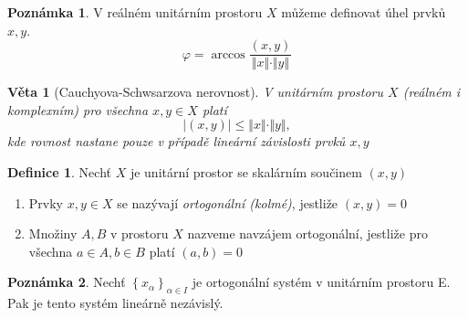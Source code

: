 \documentclass[a4]{report}
\newtheorem{theorem}{Věta}
\theoremstyle{definition}
\newtheorem{definition}{Definice}[section]
\newtheorem{notes}{Poznámka}[section]
\begin{document}
{\begin{notes}
	V reálném unitárním prostoru $X$ můžeme definovat úhel prvků $x,y$. \begin{equation*}
		\varphi = \arccos \frac{(x,y)}{\Vert x\Vert \cdot \Vert y \Vert }
	\end{equation*}
\end{notes}

\begin{theorem}[Cauchyova-Schwsarzova nerovnost]
V unitárním prostoru $X$ (reálném i komplexním) pro všechna $x,y\in X$ platí
\begin{equation*}
	\vert (x,y)\vert \leq \Vert x\Vert \cdot \Vert y \Vert,
\end{equation*}
	kde rovnost nastane pouze v případě lineární závislosti prvků $x,y$
\end{theorem}
\begin{definition}
Nechť $X$ je unitární prostor se skalárním součinem $(x,y)$
\begin{enumerate}
	\item Prvky $x,y \in X$ se nazývají \textit{ortogonální (kolmé)}, jestliže $(x,y)=0$
	\item Množiny $A,B$ v prostoru $X$ nazveme navzájem ortogonální, jestliže pro všechna $a\in A, b\in B$ platí $(a,b)=0$
\end{enumerate} 
\end{definition}

\noindent
\begin{notes}
	Nechť $ \left\lbrace x_{\alpha} \right\rbrace_{\alpha \in I} $ je ortogonální systém v unitárním prostoru E. Pak je tento systém lineárně nezávislý.
\end{notes}

}
\end{document}
